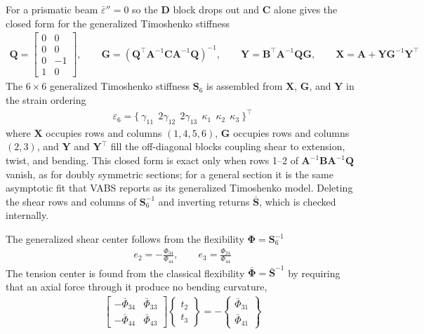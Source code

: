 \documentclass[10pt]{article}
\newcommand{\mbf}[1]{\mathbf{#1}}
\newcommand{\mbs}[1]{\boldsymbol{#1}}
\newcommand{\beq}{\begin{equation}\begin{aligned}}
\newcommand{\eeq}{\end{aligned}\end{equation}}
\begin{document}
For a prismatic beam $\bar\varepsilon'' = 0$ so the $\mbf{D}$ block drops out and $\mbf{C}$ alone gives the closed form for the generalized Timoshenko stiffness \citep[Eqs.~(4.94), (4.103)--(4.104)]{Hodges2006}
\beq
\mbf{Q} = \begin{bmatrix} 0 & 0 \\ 0 & 0 \\ 0 & -1 \\ 1 & 0 \end{bmatrix}, \qquad
\mbf{G} = \left(\mbf{Q}^\top \mbf{A}^{-1} \mbf{C} \mbf{A}^{-1} \mbf{Q}\right)^{-1}, \qquad
\mbf{Y} = \mbf{B}^\top \mbf{A}^{-1} \mbf{Q} \mbf{G}, \qquad
\mbf{X} = \mbf{A} + \mbf{Y}\mbf{G}^{-1}\mbf{Y}^\top
\label{eqn:VAMTimoQGYX}
\eeq
The $6\times6$ generalized Timoshenko stiffness $\mbf{S}_6$ is assembled from $\mbf{X}$, $\mbf{G}$, and $\mbf{Y}$ in the strain ordering
\beq
\varepsilon_6 = \{\ \gamma_{11} \ \ 2\gamma_{12} \ \ 2\gamma_{13} \ \ \kappa_1 \ \ \kappa_2 \ \ \kappa_3\ \}^\top
\label{eqn:VAMTimoOrdering}
\eeq
where $\mbf{X}$ occupies rows and columns $(1,4,5,6)$, $\mbf{G}$ occupies rows and columns $(2,3)$, and $\mbf{Y}$ and $\mbf{Y}^\top$ fill the off-diagonal blocks coupling shear to extension, twist, and bending.
This closed form is exact only when rows 1--2 of $\mbf{A}^{-1}\mbf{B}\mbf{A}^{-1}\mbf{Q}$ vanish, as for doubly symmetric sections; for a general section it is the same asymptotic fit that \ac{VABS} reports as its generalized Timoshenko model.
Deleting the shear rows and columns of $\mbf{S}_6^{-1}$ and inverting returns $\bar{\mbf{S}}$, which is checked internally.

The generalized shear center follows from the flexibility $\mbs\Phi = \mbf{S}_6^{-1}$ \citep[Eq.~(4.174)]{Hodges2006}
\beq
e_2 = -\frac{\Phi_{34}}{\Phi_{44}}, \qquad e_3 = \frac{\Phi_{24}}{\Phi_{44}}
\label{eqn:VAMShearCenter}
\eeq
The tension center is found from the classical flexibility $\bar{\mbs\Phi} = \bar{\mbf{S}}^{-1}$ by requiring that an axial force through it produce no bending curvature,
\beq
\begin{bmatrix} -\bar\Phi_{34} & \bar\Phi_{33} \\ -\bar\Phi_{44} & \bar\Phi_{43} \end{bmatrix}
\begin{Bmatrix} t_2 \\ t_3 \end{Bmatrix}
=
-\begin{Bmatrix} \bar\Phi_{31} \\ \bar\Phi_{41} \end{Bmatrix}
\label{eqn:VAMTensionCenter}
\eeq
\end{document}

